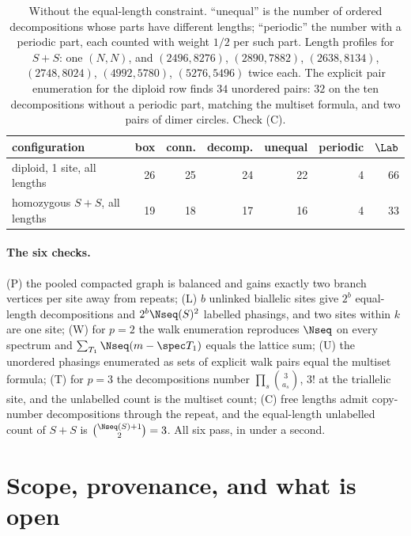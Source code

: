 \begin{table}[t]
\centering
\small
\begin{tabular}{lrrrrrr}
\toprule
configuration & box & conn. & decomp. & unequal & periodic & $\Lab$\\
\midrule
diploid, 1 site, all lengths & 26 & 25 & 24 & 22 & 4 & 66\\
homozygous $S+S$, all lengths & 19 & 18 & 17 & 16 & 4 & 33\\
\bottomrule
\end{tabular}
\caption{Without the equal-length constraint. ``unequal'' is the number of ordered
decompositions whose parts have different lengths; ``periodic'' the number with a periodic
part, each counted with weight $1/2$ per such part. Length profiles for $S+S$: one $(N,N)$,
and $(2496,8276)$, $(2890,7882)$, $(2638,8134)$, $(2748,8024)$, $(4992,5780)$, $(5276,5496)$
twice each. The explicit pair enumeration for the diploid row finds $34$ unordered pairs: $32$
on the ten decompositions without a periodic part, matching the multiset formula, and two
pairs of dimer circles. Check (C).}
\label{ch13:tab:cnv}
\end{table}

\paragraph{The six checks.} (P) the pooled compacted graph is balanced and gains exactly two
branch vertices per site away from repeats; (L) $b$ unlinked biallelic sites give $2^b$
equal-length decompositions and $2^b\Nseq(S)^2$ labelled phasings, and two sites within $k$
are one site; (W) for $p=2$ the walk enumeration reproduces $\Nseq$ on every spectrum and
$\sum_{T_1}\Nseq(m-\spec T_1)$ equals the lattice sum; (U) the unordered phasings enumerated
as sets of explicit walk pairs equal the multiset formula; (T) for $p=3$ the decompositions
number $\prod_s\binom{3}{a_s}$, $3!$ at the triallelic site, and the unlabelled count is the
multiset count; (C) free lengths admit copy-number decompositions through the repeat, and the
equal-length unlabelled count of $S+S$ is $\binom{\Nseq(S)+1}{2}=3$. All six pass, in under a
second.

\section{Scope, provenance, and what is open}

